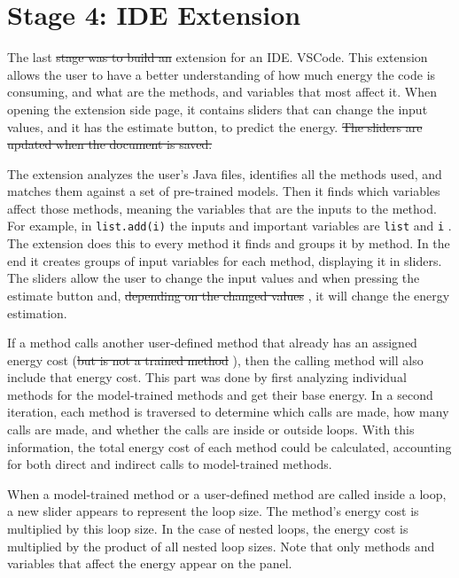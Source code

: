\section{Stage 4: IDE Extension} \label{sec:work_stage4_extension_build}

The last \st{stage was to build an}  extension for an IDE.  VSCode.  This extension allows the user to have a better understanding of how much energy the code is consuming, and what are the methods, and variables that most affect it.
When opening the extension side page, it contains sliders that can change the input values, and it has the estimate button, to predict the energy.
\st{The sliders are updated when the document is saved.}%

The extension analyzes the user's Java files, identifies all the methods used, and matches them against a set of pre-trained models. Then it finds which variables affect those methods, meaning the variables that are the inputs to the method. For example, in \texttt{list.add(i)}  the inputs and important variables are \texttt{list} and \texttt{i} .
The extension does this to every method it finds  and groups it by method. In the end it creates groups of input variables for each method, displaying it in sliders. The sliders allow the user to change the input values and when pressing the estimate button and, \st{depending on the changed values} , it will change the energy estimation.

If a method calls another user-defined method that already has an assigned energy cost (\st{but is not a trained method} ), then the calling method will also include that energy cost. This part was done by first analyzing individual methods for the model-trained methods and get their base energy. In a second iteration, each method is traversed to determine which calls are made, how many calls are made, and whether the calls are inside or outside loops. With this information, the total energy cost of each method could be calculated, accounting for both direct and indirect calls to model-trained methods.

When a model-trained method or a user-defined method are called inside a loop, a new slider appears to represent the loop size. The method’s energy cost is multiplied by this loop size. In the case of nested loops, the energy cost is multiplied by the product of all nested loop sizes. Note that only methods and variables that affect the energy appear on the panel.

